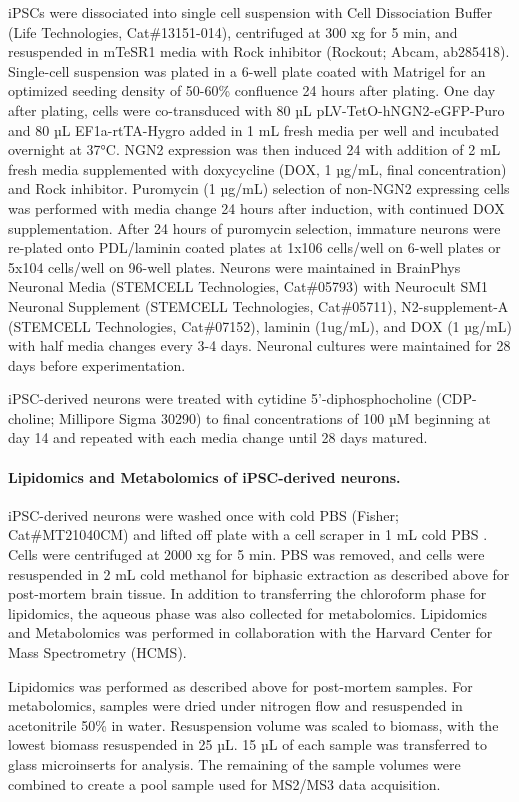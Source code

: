iPSCs were dissociated into single cell suspension with Cell Dissociation Buffer (Life Technologies, Cat\#13151-014), centrifuged at 300 xg for 5 min, and resuspended in mTeSR1 media with Rock inhibitor (Rockout; Abcam, ab285418). Single-cell suspension was plated in a 6-well plate coated with Matrigel for an optimized seeding density of 50-60\% confluence 24 hours after plating. One day after plating, cells were co-transduced with 80 µL pLV-TetO-hNGN2-eGFP-Puro and 80 µL EF1a-rtTA-Hygro added in 1 mL fresh media per well and incubated overnight at 37°C. NGN2 expression was then induced 24 with addition of 2 mL fresh media supplemented with doxycycline (DOX, 1 µg/mL, final concentration) and Rock inhibitor. Puromycin (1 µg/mL) selection of non-NGN2 expressing cells was performed with media change 24 hours after induction, with continued DOX supplementation. After 24 hours of puromycin selection, immature neurons were re-plated onto PDL/laminin coated plates at 1x106 cells/well on 6-well plates or 5x104 cells/well on 96-well plates. Neurons were maintained in BrainPhys Neuronal Media (STEMCELL Technologies, Cat\#05793) with Neurocult SM1 Neuronal Supplement (STEMCELL Technologies, Cat\#05711), N2-supplement-A (STEMCELL Technologies, Cat\#07152), laminin (1ug/mL), and DOX (1 µg/mL) with half media changes every 3-4 days. Neuronal cultures were maintained for 28 days before experimentation.

iPSC-derived neurons were treated with cytidine 5’-diphosphocholine (CDP-choline; Millipore Sigma 30290) to final concentrations of 100 µM beginning at day 14 and repeated with each media change until 28 days matured.

\paragraph{Lipidomics and Metabolomics of iPSC-derived neurons.}
iPSC-derived neurons were washed once with cold PBS (Fisher; Cat\#MT21040CM) and lifted off plate with a cell scraper in 1 mL cold PBS . Cells were centrifuged at 2000 xg for 5 min. PBS was removed, and cells were resuspended in 2 mL cold methanol for biphasic extraction as described above for post-mortem brain tissue. In addition to transferring the chloroform phase for lipidomics, the aqueous phase was also collected for metabolomics. Lipidomics and Metabolomics was performed in collaboration with the Harvard Center for Mass Spectrometry (HCMS).

Lipidomics was performed as described above for post-mortem samples. For metabolomics, samples were dried under nitrogen flow and resuspended in acetonitrile 50\% in water. Resuspension volume was scaled to biomass, with the lowest biomass resuspended in 25 µL. 15 µL of each sample was transferred to glass microinserts for analysis. The remaining of the sample volumes were combined to create a pool sample used for MS2/MS3 data acquisition.

